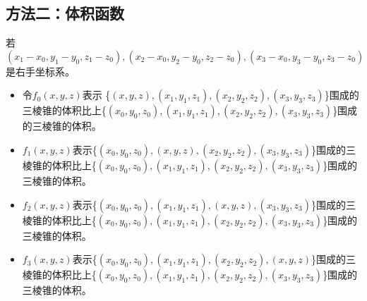 \documentclass[12pt,a4paper]{article}
\begin{document}
\subsection*{方法二：体积函数}
若$(x_1-x_0,y_1-y_0,z_1-z_0),(x_2-x_0,y_2-y_0,z_2-z_0),(x_3-x_0,y_3-y_0,z_3-z_0)$是右手坐标系。\\
\begin{itemize}
\item 令$f_0(x,y,z)$表示 \{$(x,y,z),(x_1,y_1,z_1),(x_2,y_2,z_2),(x_3,y_3,z_3)$\}围成的三棱锥的体积比上\{$(x_0,y_0,z_0),(x_1,y_1,z_1),(x_2,y_2,z_2),(x_3,y_3,z_3)$\}围成的三棱锥的体积。\\
\item $f_1(x,y,z)$表示\{$(x_0,y_0,z_0),(x,y,z),(x_2,y_2,z_2),(x_3,y_3,z_3)$\}围成的三棱锥的体积比上\{$(x_0,y_0,z_0),(x_1,y_1,z_1),(x_2,y_2,z_2),(x_3,y_3,z_3)$\}围成的三棱锥的体积。\\
\item $f_2(x,y,z)$表示\{$(x_0,y_0,z_0),(x_1,y_1,z_1),(x,y,z),(x_3,y_3,z_3)$\}围成的三棱锥的体积比上\{$(x_0,y_0,z_0),(x_1,y_1,z_1),(x_2,y_2,z_2),(x_3,y_3,z_3)$\}围成的三棱锥的体积。\\
\item $f_3(x,y,z)$表示\{$(x_0,y_0,z_0),(x_1,y_1,z_1),(x_2,y_2,z_2),(x,y,z)$\}围成的三棱锥的体积比上\{$(x_0,y_0,z_0),(x_1,y_1,z_1),(x_2,y_2,z_2),(x_3,y_3,z_3)$\}围成的三棱锥的体积。\\
\end{itemize}
\end{document}
